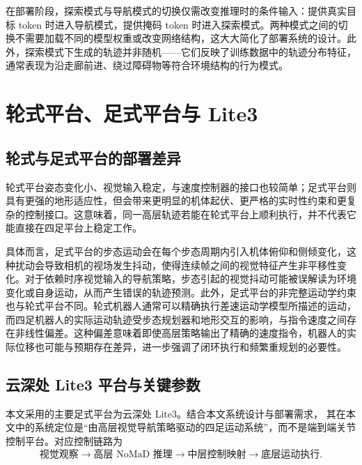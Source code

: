 在部署阶段，探索模式与导航模式的切换仅需改变推理时的条件输入：提供真实目标 token 时进入导航模式，提供掩码 token 时进入探索模式。两种模式之间的切换不需要加载不同的模型权重或改变网络结构，这大大简化了部署系统的设计。此外，探索模式下生成的轨迹并非随机——它们反映了训练数据中的轨迹分布特征，通常表现为沿走廊前进、绕过障碍物等符合环境结构的行为模式。

\section{轮式平台、足式平台与 Lite3}

\subsection{轮式与足式平台的部署差异}

轮式平台姿态变化小、视觉输入稳定，与速度控制器的接口也较简单；足式平台则具有更强的地形适应性，但会带来更明显的机体起伏、更严格的实时性约束和更复杂的控制接口\cite{hwangbo2019anymal,lee2020learning}。这意味着，同一高层轨迹若能在轮式平台上顺利执行，并不代表它能直接在四足平台上稳定工作。

具体而言，足式平台的步态运动会在每个步态周期内引入机体俯仰和侧倾变化，这种扰动会导致相机的视场发生抖动，使得连续帧之间的视觉特征产生非平移性变化。对于依赖时序视觉输入的导航策略，步态引起的视觉抖动可能被误解读为环境变化或自身运动，从而产生错误的轨迹预测。此外，足式平台的非完整运动学约束也与轮式平台不同。轮式机器人通常可以精确执行差速运动学模型所描述的运动，而四足机器人的实际运动轨迹受步态规划器和地形交互的影响，与指令速度之间存在非线性偏差。这种偏差意味着即使高层策略输出了精确的速度指令，机器人的实际位移也可能与预期存在差异，进一步强调了闭环执行和频繁重规划的必要性。
 

\subsection{云深处 Lite3 平台与关键参数}

本文采用的主要足式平台为云深处 Lite3。结合本文系统设计与部署需求，
其在本文中的系统定位是``由高层视觉导航策略驱动的四足运动系统''，而不是端到端关节控制平台。对应控制链路为
\begin{equation}
\text{视觉观察} \rightarrow \text{高层 NoMaD 推理} \rightarrow \text{中层控制映射} \rightarrow \text{底层运动执行}.
\end{equation}

